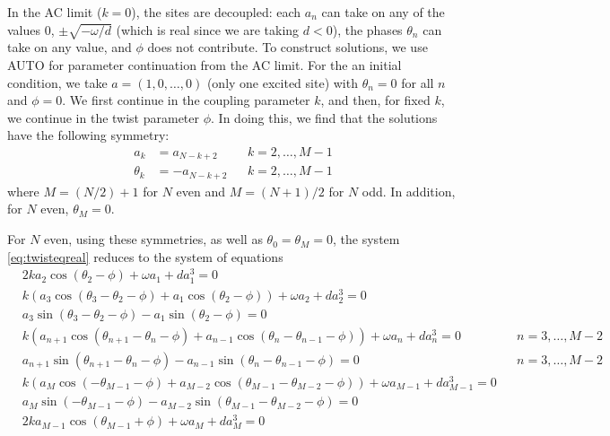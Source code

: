 \documentclass[12pt]{article}
\begin{document}
In the AC limit ($k = 0$), the sites are decoupled: each $a_n$ can take on any of the values 0, $\pm \sqrt{-\omega/d}$ (which is real since we are taking $d<0$), the phases $\theta_n$ can take on any value, and $\phi$ does not contribute. To construct solutions, we use AUTO for parameter continuation from the AC limit. For the an initial condition, we take $a = (1, 0, \dots, 0)$ (only one excited site) with $\theta_n = 0$ for all $n$ and $\phi = 0$. We first continue in the coupling parameter $k$, and then, for fixed $k$, we continue in the twist parameter $\phi$. In doing this, we find that the solutions have the following symmetry:
\begin{equation}
\begin{aligned}
a_k &= a_{N-k+2} && k = 2, \dots, M-1 \\
\theta_k &= -a_{N-k+2} && k = 2, \dots, M-1 
\end{aligned}
\end{equation}
where $M = (N/2)+1$ for $N$ even and $M = (N+1)/2$ for $N$ odd. In addition, for $N$ even, $\theta_M = 0$. 

For $N$ even, using these symmetries, as well as $\theta_0 = \theta_M = 0$, the system \cref{eq:twisteqreal} reduces to the system of equations
\begin{equation}\label{eq:twisteqeven}
\begin{aligned}
&2 k a_2 \cos(\theta_2 - \phi) + \omega a_1 + d a_1^3 = 0 \\
&k\left( a_3 \cos(\theta_3-\theta_2-\phi) + a_1 \cos(\theta_2-\phi)\right) + \omega a_2 + d a_2^3 = 0 \\
&a_3 \sin(\theta_3-\theta_2-\phi) - a_1 \sin(\theta_2-\phi) = 0 \\
&k\left( a_{n+1} \cos(\theta_{n+1}-\theta_n-\phi) + a_{n-1} \cos(\theta_n - \theta_{n-1}-\phi)\right) + \omega a_n + d a_n^3 = 0 && n = 3, \dots, M-2 \\
&a_{n+1} \sin(\theta_{n+1}-\theta_n-\phi) - a_{n-1} \sin(\theta_n - \theta_{n-1}-\phi) = 0 && n = 3, \dots, M-2 \\
&k\left( a_M \cos(-\theta_{M-1}-\phi) + a_{M-2} \cos(\theta_{M-1} - \theta_{M-2}-\phi)\right) + \omega a_{M-1} + d a_{M-1}^3 = 0 \\
&a_M \sin(-\theta_{M-1} -\phi) - a_{M-2} \sin(\theta_{M-1} - \theta_{M-2}-\phi) = 0 \\
&2 k a_{M-1} \cos(\theta_{M-1} + \phi) + \omega a_M + d a_M^3 = 0
\end{aligned}
\end{equation}
\end{document}

